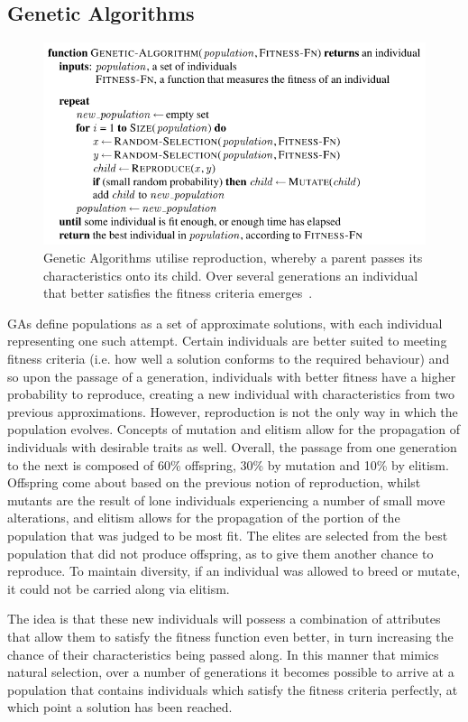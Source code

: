 \documentclass[UKenglish]{svproc}
\begin{document}
\subsection{Genetic Algorithms}

\begin{figure}[!ht]
  \centering
  \includegraphics[width=0.8\linewidth]{genetic-algorithm}
  \caption{Genetic Algorithms utilise reproduction, whereby a parent passes its
    characteristics onto its child. Over several generations an individual that
    better satisfies the fitness criteria emerges~\autocite{10.5555/1671238}.}
  \label{fig:genetic-algorithm}
\end{figure}

GAs define populations as a set of approximate solutions, with each individual representing one such attempt. Certain individuals are better suited to meeting fitness criteria (i.e. how well a solution conforms to the required behaviour) and so upon the passage of a generation, individuals with better fitness have a higher probability to reproduce, creating a new individual with characteristics from two previous approximations. However, reproduction is not the only way in which the population evolves. Concepts of mutation and elitism allow for the propagation of individuals with desirable traits as well. Overall, the passage from one generation to the next is composed of 60\% offspring, 30\% by mutation and 10\% by elitism. Offspring come about based on the previous notion of reproduction, whilst mutants are the result of lone individuals experiencing a number of small move alterations, and elitism allows for the propagation of the portion of the population that was judged to be most fit. The elites are selected from the best population that did not produce offspring, as to give them another chance to reproduce. To maintain diversity, if an individual was allowed to breed or mutate, it could not be carried along via elitism.

The idea is that these new individuals will possess a combination of attributes that allow them to satisfy the fitness function even better, in turn increasing the chance of their characteristics being passed along. In this manner that mimics natural selection, over a number of generations it becomes possible to arrive at a population that contains individuals which satisfy the fitness criteria perfectly, at which point a solution has been reached.
\end{document}
